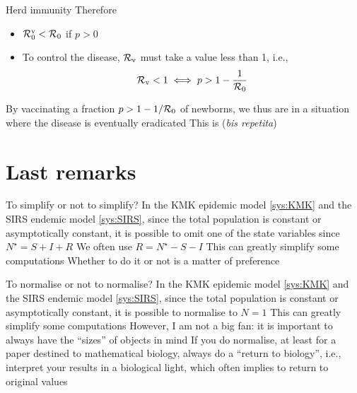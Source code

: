\documentclass[aspectratio=169]{beamer}\usepackage[]{graphicx}\usepackage[]{xcolor}
\begin{document}
\begin{frame}{Herd immunity}
  Therefore 
  \begin{itemize}
  \item $\mathcal{R}_0^{\textrm{v}}<\mathcal{R}_0$ if $p>0$
  \item To control the disease, $\mathcal{R}_{\text{v}}$ must take a value less than 1, i.e.,
  \begin{equation}
    \mathcal{R}_{\text{v}}<1 \iff p> 1-\frac{1}{\mathcal{R}_0}
  \end{equation}
  \end{itemize}
  \vfill
  By vaccinating a fraction $p>1-1/\mathcal{R}_0$ of newborns, we thus are in a situation where the disease is eventually eradicated
  \vfill
  This is  (\emph{bis repetita})
\end{frame}


\section{Last remarks}

\begin{frame}{To simplify or not to simplify?}
\bbullet In the KMK epidemic model \eqref{sys:KMK} and the SIRS endemic model \eqref{sys:SIRS}, since the total population is constant or asymptotically constant, it is possible to omit one of the state variables since $N^\star=S+I+R$
\vfill
\bbullet We often use $R=N^\star-S-I$
\vfill
\bbullet This can greatly simplify some computations
\vfill
\bbullet Whether to do it or not is a matter of preference
\end{frame}

\begin{frame}{To normalise or not to normalise?}
\bbullet In the KMK epidemic model \eqref{sys:KMK} and the SIRS endemic model \eqref{sys:SIRS}, since the total population is constant or asymptotically constant, it is possible to normalise to $N=1$
\vfill
\bbullet This can greatly simplify some computations
\vfill
\bbullet However, I am not a big fan: it is important to always have the ``sizes'' of objects in mind
\vfill
\bbullet If you do normalise, at least for a paper destined to mathematical biology, always do a ``return to biology'', i.e., interpret your results in a biological light, which often implies to return to original values
\end{frame}
\end{document}

